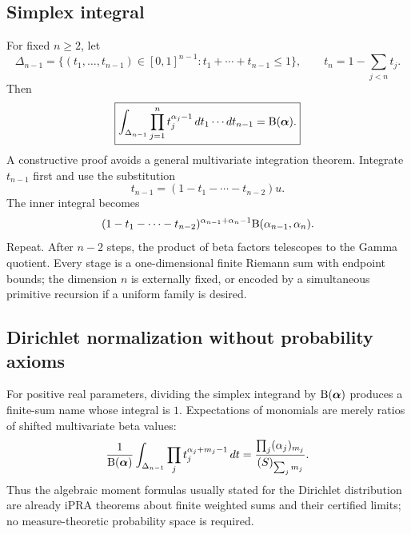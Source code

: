 \subsection{Simplex integral}

For fixed $n\ge2$, let
\[
 \Delta_{n-1}=
 \{(t_1,\ldots,t_{n-1})\in[0,1]^{n-1}:
   t_1+\cdots+t_{n-1}\le1\},
 \qquad
 t_n=1-\sum_{j<n}t_j.
\]
Then
\begin{equation}
 \boxed{
 \int_{\Delta_{n-1}}\prod_{j=1}^{n}t_j^{\alpha_j-1}
 \,dt_1\cdots dt_{n-1}
 =\mathrm B(\boldsymbol\alpha).}
 \label{eq:simplex-beta}
\end{equation}
A constructive proof avoids a general multivariate integration theorem.  Integrate $t_{n-1}$ first and use the substitution
\[
 t_{n-1}=(1-t_1-\cdots-t_{n-2})u.
\]
The inner integral becomes
\[
 (1-t_1-\cdots-t_{n-2})^{\alpha_{n-1}+\alpha_n-1}
 \mathrm B(\alpha_{n-1},\alpha_n).
\]
Repeat.  After $n-2$ steps, the product of beta factors telescopes to the Gamma quotient.  Every stage is a one-dimensional finite Riemann sum with endpoint bounds; the dimension $n$ is externally fixed, or encoded by a simultaneous primitive recursion if a uniform family is desired.

\subsection{Dirichlet normalization without probability axioms}

For positive real parameters, dividing the simplex integrand by
$\mathrm B(\boldsymbol\alpha)$ produces a finite-sum name whose integral is $1$.  Expectations of monomials are merely ratios of shifted multivariate beta values:
\[
 \frac{1}{\mathrm B(\boldsymbol\alpha)}
 \int_{\Delta_{n-1}}
 \prod_j t_j^{\alpha_j+m_j-1}\,dt
 =
 \frac{\prod_j(\alpha_j)_{m_j}}
      {(S)_{\sum_jm_j}}.
\]
Thus the algebraic moment formulas usually stated for the Dirichlet distribution are already iPRA theorems about finite weighted sums and their certified limits; no measure-theoretic probability space is required.

